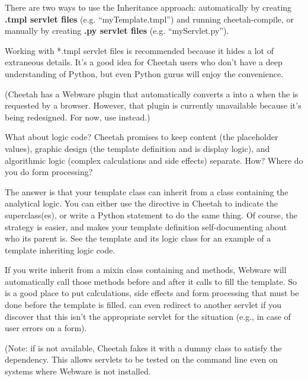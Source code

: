 There are two ways to use the Inheritance approach: automatically by creating
{\bf *.tmpl servlet files} (e.g. ``myTemplate.tmpl'') and running
cheetah-compile, or manually by creating {\bf .py servlet files} (e.g.
``myServlet.py'').

Working with *.tmpl servlet files is recommended because it hides a lot of
extraneous details.  It's a good idea for Cheetah users who don't have a deep
understanding of Python, but even Python gurus will enjoy the convenience.

(Cheetah has a Webware plugin that automatically converts a  into a  when the  is
requested by a browser.  However, that plugin is currently unavailable because
it's being redesigned.  For now, use  instead.)

What about logic code?  Cheetah promises to keep content (the placeholder
values), graphic design (the template definition and is display logic), and
algorithmic logic (complex calculations and side effects) separate.  How?
Where do you do form processing?

The answer is that your template class can inherit from a class containing
the analytical logic.  You can either use the  directive in
Cheetah to indicate the superclass(es), or write a Python 
statement to do the same thing.  Of course, the  strategy is
easier, and makes your template definition self-documenting about who its
parent is.  See the template  and its
logic class  for an example of 
a template inheriting logic code.

If you write inherit from a mixin class containing  and 
 methods, Webware will automatically call those methods before
and after it calls  to fill the template.  So 
 is a good place to put calculations, side effects and 
form processing that must be done before the template is filled.
 can even redirect to another servlet if you discover that this
isn't the appropriate servlet for the situation (e.g., in case of user errors
on a form).  

(Note: if  is not available, Cheetah fakes it with a
dummy class to satisfy the dependency.  This allows servlets to be tested on
the command line even on systems where Webware is not installed.

